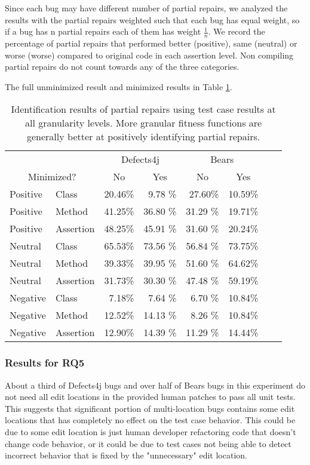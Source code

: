 \documentclass[sigconf, timestamp-false, anonymous=true]{acmart}
\begin{document}
Since each bug may have different 
number of partial repairs, we analyzed the results with the partial repairs weighted such that each bug
has equal weight, so if a bug has n partial repairs each of them has weight 
$\frac{1}{n}$. We record the percentage of partial repairs that performed better (positive), same (neutral)
or worse (worse) compared to original code in each assertion level. Non compiling
partial repairs do not count towards any of the three categories.

The full unminimized result and minimized results in Table \ref{yiweitable}.


\begin{table}
{\begin{center}
\begin{tabular}{ll|rr|rrrr}
\toprule
\multicolumn{2}{c}{}&\multicolumn{2}{c}{Defects4j} & \multicolumn{2}{c}{Bears} \\
\multicolumn{2}{c}{Minimized?} & \multicolumn{1}{c}{No} & \multicolumn{1}{c}{Yes} & \multicolumn{1}{c}{No} & \multicolumn{1}{c}{Yes}  \\
\midrule
Positive & Class & 20.46\% & 9.78 \% & 27.60\% & 10.59\%  \\
Positive & Method & 41.25\% & 36.80 \% & 31.29 \% & 19.71\%  \\
Positive & Assertion & 48.25\% & 45.91 \% & 31.60 \% & 20.24\%  \\ 
\midrule
Neutral & Class & 65.53\% & 73.56 \% & 56.84 \% & 73.75\% \\
Neutral & Method & 39.33\% & 39.95 \% & 51.60 \% & 64.62\%  \\
Neutral & Assertion & 31.73\% & 30.30 \% & 47.48 \% &  59.19\%  \\ 
\midrule
Negative & Class & 7.18\% & 7.64 \% & 6.70 \% & 10.84\%  \\
Negative & Method & 12.52\% & 14.13 \% & 8.26 \% & 10.84\%  \\
Negative & Assertion & 12.90\% & 14.39 \% & 11.29 \% &  14.44\%  \\ 
\bottomrule
\end{tabular}
\end{center}}
\caption{Identification results of partial repairs using test case results
at all granularity levels.
More granular fitness functions are generally better at positively identifying partial repairs. }
\label{yiweitable}
\end{table}

\subsubsection{Results for RQ5}
About a third of Defects4j bugs and over half of
Bears bugs in this experiment do not need all edit locations in the provided human patches to pass
all unit tests. This suggests that significant portion of multi-location bugs contains some
edit locations that has completely no effect on the test case behavior. This could be due to some
edit location is just human developer refactoring code that doesn't change code behavior,
or it could be due to test cases not being able to detect incorrect behavior that is fixed
by the "unnecessary" edit location.
\end{document}
